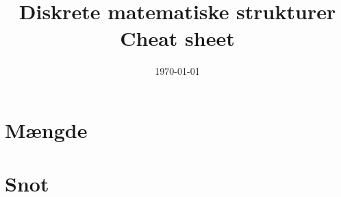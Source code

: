 \documentclass{article}
\title{Diskrete matematiske strukturer\\ 
          Cheat sheet}
\date{\today}
\begin{document}
\maketitle
\clearpage
\section{M{\ae}ngde}
\section{Snot}
\end{document}

